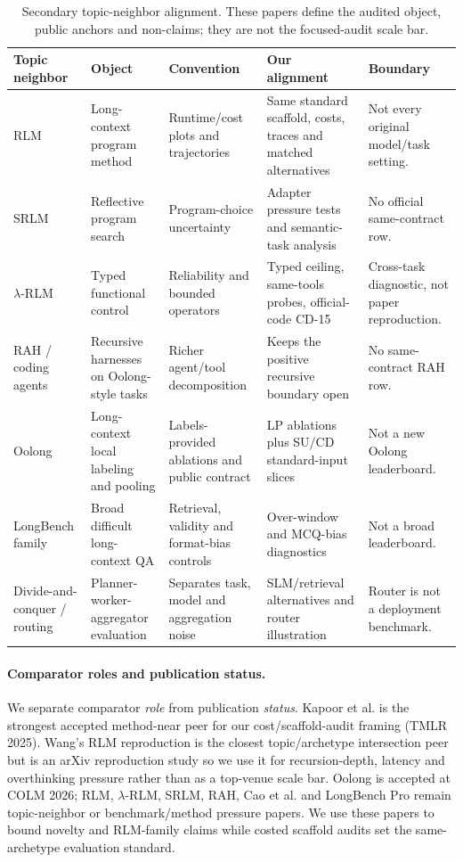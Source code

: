 \documentclass[letterpaper]{article}
\begin{document}
\begin{table}[!t]
\centering
\small
\setlength{\tabcolsep}{2.5pt}
\begin{tabular}{@{}p{2.5cm}p{3.0cm}p{3.2cm}p{4.0cm}p{3.2cm}@{}}
\toprule
\textbf{Topic neighbor} & \textbf{Object} & \textbf{Convention} & \textbf{Our alignment} & \textbf{Boundary} \\
\midrule
RLM & Long-context program method & Runtime/cost plots and trajectories & Same standard scaffold, costs, traces and matched alternatives & Not every original model/task setting. \\
SRLM & Reflective program search & Program-choice uncertainty & Adapter pressure tests and semantic-task analysis & No official same-contract row. \\
$\lambda$-RLM & Typed functional control & Reliability and bounded operators & Typed ceiling, same-tools probes, official-code CD-15 & Cross-task diagnostic, not paper reproduction. \\
RAH / coding agents & Recursive harnesses on Oolong-style tasks & Richer agent/tool decomposition & Keeps the positive recursive boundary open & No same-contract RAH row. \\
Oolong & Long-context local labeling and pooling & Labels-provided ablations and public contract & LP ablations plus SU/CD standard-input slices & Not a new Oolong leaderboard. \\
LongBench family & Broad difficult long-context QA & Retrieval, validity and format-bias controls & Over-window and MCQ-bias diagnostics & Not a broad leaderboard. \\
Divide-and-conquer / routing & Planner-worker-aggregator evaluation & Separates task, model and aggregation noise & SLM/retrieval alternatives and router illustration & Router is not a deployment benchmark. \\
\bottomrule
\end{tabular}
\caption{Secondary topic-neighbor alignment. These papers define the audited object, public anchors and non-claims; they are not the focused-audit scale bar.}
\label{tab:supp-comparator-topic-alignment}
\end{table}

\paragraph{Comparator roles and publication status.}
We separate comparator \emph{role} from publication \emph{status}. Kapoor et al. is the strongest accepted method-near peer for our cost/scaffold-audit framing (TMLR 2025). Wang's RLM reproduction is the closest topic/archetype intersection peer but is an arXiv reproduction study so we use it for recursion-depth, latency and overthinking pressure rather than as a top-venue scale bar. Oolong is accepted at COLM 2026; RLM, $\lambda$-RLM, SRLM, RAH, Cao et al. and LongBench Pro remain topic-neighbor or benchmark/method pressure papers. We use these papers to bound novelty and RLM-family claims while costed scaffold audits set the same-archetype evaluation standard.
\end{document}
